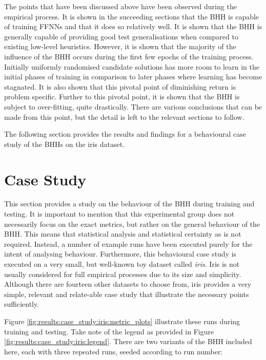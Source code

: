 The points that have been discussed above have been observed during the empirical process. It is shown in the succeeding sections that the \Acs{BHH} is capable of training \Acp{FFNN} and that it does so relatively well. It is shown that the \Acs{BHH} is generally capable of providing good test generalisations when compared to existing low-level heuristics. However, it is shown that the majority of the influence of the \Acs{BHH} occurs during the first few epochs of the training process. Initially uniformly randomised candidate solutions has more room to learn in the initial phases of training in comparison to later phases where learning has become stagnated. It is also shown that this pivotal point of diminishing return is problem specific. Further to this pivotal point, it is shown that the \Acs{BHH} is subject to over-fitting, quite drastically. There are various conclusions that can be made from this point, but the detail is left to the relevant sections to follow.

The following section provides the results and findings for a behavioural case study of the \Acp{BHH} on the iris dataset.


\section{Case Study}
\label{sec:results:case_study}

This section provides a study on the behaviour of the \Acs{BHH} during training and testing. It is important to mention that this experimental group does not necessarily focus on the exact metrics, but rather on the general behaviour of the \Ac{BHH}. This means that statistical analysis and statistical certainty as is not required. Instead, a number of example runs have been executed purely for the intent of analysing behaviour. Furthermore, this behavioural case study is executed on a very small, but well-known toy dataset called \textit{iris}. Iris is not usually considered for full empirical processes due to its size and simplicity. Although there are fourteen other datasets to choose from, iris provides a very simple, relevant and relate-able case study that illustrate the necessary points sufficiently.

Figure \ref{fig:results:case_study:iris:metric_plots} illustrate these runs during training and testing. Take note of the legend as provided in Figure \ref{fig:results:case_study:iris:legend}. There are two variants of the \Acs{BHH} included here, each with three repeated runs, seeded according to run number:

